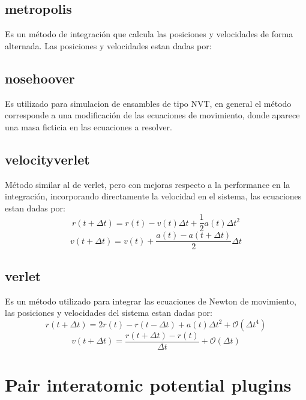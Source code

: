 \subsection{metropolis}
Es un m\'etodo de integraci\'on que calcula las posiciones y velocidades de
forma alternada. Las posiciones y velocidades estan dadas por:

\subsection{nosehoover}
Es utilizado para simulacion de ensambles de tipo NVT, en general el m\'etodo
corresponde a una modificaci\'on de las ecuaciones de movimiento, donde aparece
una masa ficticia en las ecuaciones a resolver.


\subsection{velocityverlet}
M\'etodo similar al de verlet, pero con mejoras respecto a la performance en la
integraci\'on, incorporando directamente la velocidad en el sistema, las
ecuaciones estan dadas por:
$$r(t+\Delta t) = r(t) - v(t)\Delta t + \frac{1}{2}a(t)\Delta t^2$$
$$v(t+\Delta t) = v(t) + \frac{a(t) - a(t + \Delta t)}{2}\Delta t$$

\subsection{verlet}
Es un m\'etodo utilizado para integrar las ecuaciones de Newton de movimiento,
las posiciones y velocidades del sistema estan dadas por:
$$r(t+\Delta t) = 2r(t) - r(t-\Delta t) + a(t)\Delta t^2 + \mathcal{O}(\Delta t^4)$$
$$v(t+\Delta t) = \frac{r(t+\Delta t) - r(t)}{\Delta t} + \mathcal{O}(\Delta t)$$



\section{Pair interatomic potential plugins}
